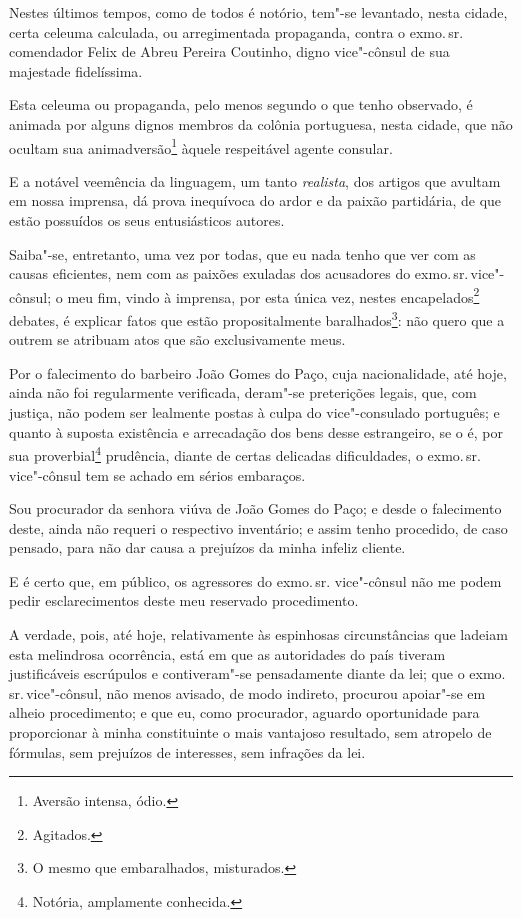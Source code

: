 Nestes últimos tempos, como de todos é notório, tem"-se levantado, nesta
cidade, certa celeuma calculada, ou arregimentada propaganda, contra o
exmo.\,sr.\,comendador Felix de Abreu Pereira Coutinho, digno vice"-cônsul
de sua majestade fidelíssima.

Esta celeuma ou propaganda, pelo menos segundo o que tenho observado, é
animada por alguns dignos membros da colônia portuguesa, nesta cidade,
que não ocultam sua animadversão\footnote{Aversão intensa, ódio.}
àquele respeitável agente consular.

E a notável veemência da linguagem, um tanto \emph{realista}, dos
artigos que avultam em nossa imprensa, dá prova inequívoca do ardor e da
paixão partidária, de que estão possuídos os seus entusiásticos autores.

Saiba"-se, entretanto, uma vez por todas, que eu nada tenho que ver com
as causas eficientes, nem com as paixões exuladas dos acusadores do
exmo.\,sr.\,vice"-cônsul; o meu fim, vindo à imprensa, por esta única vez,
nestes encapelados\footnote{Agitados.} debates, é explicar fatos que
estão propositalmente baralhados\footnote{O mesmo que embaralhados,
  misturados.}: não quero que a outrem se atribuam atos que são
exclusivamente meus.

Por o falecimento do barbeiro João Gomes do Paço, cuja nacionalidade,
até hoje, ainda não foi regularmente verificada, deram"-se preterições
legais, que, com justiça, não podem ser lealmente postas à culpa do
vice"-consulado português; e quanto à suposta existência e arrecadação
dos bens desse estrangeiro, se o é, por sua proverbial\footnote{
  Notória, amplamente conhecida.}
prudência, diante de certas
delicadas dificuldades, o exmo.\,sr.\,vice"-cônsul tem se achado em sérios
embaraços.

Sou procurador da senhora viúva de João Gomes do Paço; e desde o
falecimento deste, ainda não requeri o respectivo inventário; e assim
tenho procedido, de caso pensado, para não dar causa a prejuízos da
minha infeliz cliente.

E é certo que, em público, os agressores do exmo.\,sr. vice"-cônsul não me
podem pedir esclarecimentos deste meu reservado procedimento.

A verdade, pois, até hoje, relativamente às espinhosas circunstâncias
que ladeiam esta melindrosa ocorrência, está em que as autoridades do
país tiveram justificáveis escrúpulos e contiveram"-se pensadamente
diante da lei; que o exmo.\,sr.\,vice"-cônsul, não menos avisado, de modo
indireto, procurou apoiar"-se em alheio procedimento; e que eu, como
procurador, aguardo oportunidade para proporcionar à minha constituinte
o mais vantajoso resultado, sem atropelo de fórmulas, sem prejuízos de
interesses, sem infrações da lei.

